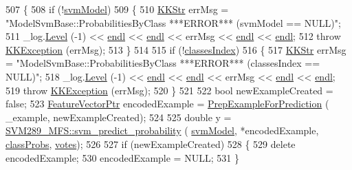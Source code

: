 \begin{DoxyCode}
507 \{
508   \textcolor{keywordflow}{if}  (!\hyperlink{class_k_k_m_l_l_1_1_model_svm_base_a8f6ed793dfaa080ddea8e1776d2ee755}{svmModel})
509   \{
510     \hyperlink{class_k_k_b_1_1_k_k_str}{KKStr} errMsg = \textcolor{stringliteral}{"ModelSvmBase::ProbabilitiesByClass   ***ERROR***      (svmModel == NULL)"};
511     \_log.\hyperlink{class_k_k_b_1_1_run_log_a32cf761d7f2e747465fd80533fdbb659}{Level} (-1) << \hyperlink{namespace_k_k_b_ad1f50f65af6adc8fa9e6f62d007818a8}{endl} << \hyperlink{namespace_k_k_b_ad1f50f65af6adc8fa9e6f62d007818a8}{endl} << errMsg << \hyperlink{namespace_k_k_b_ad1f50f65af6adc8fa9e6f62d007818a8}{endl} << \hyperlink{namespace_k_k_b_ad1f50f65af6adc8fa9e6f62d007818a8}{endl};
512     \textcolor{keywordflow}{throw} \hyperlink{class_k_k_b_1_1_k_k_exception}{KKException} (errMsg);
513   \}
514 
515   \textcolor{keywordflow}{if}  (!\hyperlink{class_k_k_m_l_l_1_1_model_adbb9475e16bb2c3eef52170485e3018e}{classesIndex})
516   \{
517     \hyperlink{class_k_k_b_1_1_k_k_str}{KKStr} errMsg = \textcolor{stringliteral}{"ModelSvmBase::ProbabilitiesByClass   ***ERROR***      (classesIndex == NULL)"};
518     \_log.\hyperlink{class_k_k_b_1_1_run_log_a32cf761d7f2e747465fd80533fdbb659}{Level} (-1) << \hyperlink{namespace_k_k_b_ad1f50f65af6adc8fa9e6f62d007818a8}{endl} << \hyperlink{namespace_k_k_b_ad1f50f65af6adc8fa9e6f62d007818a8}{endl} << errMsg << \hyperlink{namespace_k_k_b_ad1f50f65af6adc8fa9e6f62d007818a8}{endl} << \hyperlink{namespace_k_k_b_ad1f50f65af6adc8fa9e6f62d007818a8}{endl};
519     \textcolor{keywordflow}{throw} \hyperlink{class_k_k_b_1_1_k_k_exception}{KKException} (errMsg);
520   \}
521 
522   \textcolor{keywordtype}{bool}  newExampleCreated = \textcolor{keyword}{false};
523   \hyperlink{class_k_k_m_l_l_1_1_feature_vector}{FeatureVectorPtr}  encodedExample = \hyperlink{class_k_k_m_l_l_1_1_model_a31b972adfb64769b3ae966debec824fd}{PrepExampleForPrediction} (
      \_example, newExampleCreated);
524 
525   \textcolor{keywordtype}{double}  y = \hyperlink{namespace_s_v_m289___m_f_s_ac0623d29bd02989f751e50d1cb3c8855}{SVM289\_MFS::svm\_predict\_probability} (
      \hyperlink{class_k_k_m_l_l_1_1_model_svm_base_a8f6ed793dfaa080ddea8e1776d2ee755}{svmModel},  *encodedExample, \hyperlink{class_k_k_m_l_l_1_1_model_a9d51bc464ab7049659aeea120bf9db26}{classProbs}, \hyperlink{class_k_k_m_l_l_1_1_model_a7d13e2ff97ace39ec4423fd4bfa9ecf2}{votes});
526 
527   \textcolor{keywordflow}{if}  (newExampleCreated)
528   \{
529     \textcolor{keyword}{delete} encodedExample;
530     encodedExample = NULL;
531   \}

\end{DoxyCode}
